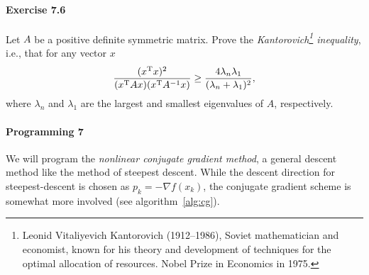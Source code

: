 \paragraph{Exercise 7.6}
Let $A$ be a positive definite symmetric matrix. Prove the
\emph{Kantorovich\footnote{Leonid Vitaliyevich Kantorovich (1912--1986),
    Soviet mathematician and economist, known for his theory and development
    of techniques for the optimal allocation of resources. Nobel Prize in
    Economics in 1975.} inequality}, i.e., that for any vector $x$
\[
  \frac{(x^{\text{\upshape T}} x)^2}{(x^{\text{\upshape T}} A x)(x^{\text{\upshape T}} A^{-1}x)}
  \ge \frac{4\lambda_n\lambda_1}{(\lambda_n + \lambda_1)^2},
\]
where $\lambda_n$ and $\lambda_1$ are the largest and smallest eigenvalues of
$A$, respectively.

%
%

\paragraph{Programming 7}
We will program the \emph{nonlinear conjugate gradient method}, a general
descent method like the method of steepest descent. While the descent
direction for steepest-descent is chosen as $p_k=-\nabla f(x_k)$, the
conjugate gradient scheme is somewhat more involved (see algorithm~\ref{alg:cg}).

